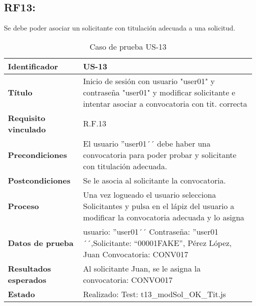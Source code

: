 \subsection{RF13:} Se debe poder asociar un solicitante con titulación adecuada a una solicitud.
\begin{table}[H]
	\centering
	\renewcommand{\arraystretch}{1.3} 
	\begin{tabularx}{\textwidth}{|l|X|}
		\hline
		\textbf{Identificador} & US-13 \\
		\hline
		\textbf{Título} & Inicio de sesión con usuario "user01" y contraseña "user01" y modificar solicitante e intentar asociar a convocatoria con tit. correcta\\
		\hline
		\textbf{Requisito vinculado} & R.F.13 \\
		\hline
		\textbf{Precondiciones} & El usuario ''user01´´ debe haber una convocatoria para poder probar y solicitante con titulación adecuada.\\
		\hline
		\textbf{Postcondiciones} & Se le asocia al solicitante la convocatoria. \\
		\hline
		\textbf{Proceso} & Una vez logueado el usuario selecciona Solicitantes y pulsa en el lápiz del usuario a modificar la convocatoria adecuada y lo asigna\\
		\hline
		\textbf{Datos de prueba} & usuario: ''user01´´ Contraseña: ''user01´´,Solicitante: “00001FAKE”, Pérez López, Juan Convocatoria: CONV017
		\\
		\hline
		\textbf{Resultados esperados} & Al solicitante Juan, se le asigna la convocatoria: CONVO017 \\
		\hline
		\textbf{Estado} & Realizado: Test: t13\_modSol\_OK\_Tit.js\\
		\hline
	\end{tabularx}
	\caption{Caso de prueba US-13}
	\label{tab:caso_uso13}
\end{table}

